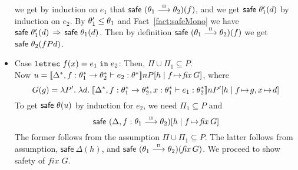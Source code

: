 \documentclass[submission,copyright,creativecommons]{eptcs}
\newcommand{\IN}{\mbox{\texttt{in}}}
\newcommand{\LET}{\mbox{\texttt{let}}}
\newcommand{\REC}{{\texttt{rec}}}
\newcommand{\ldb}{[\![}
\newcommand{\rdb}{]\!]}
\newcommand{\means}[1]{\ldb {#1}\rdb}
\newcommand{\union}{\cup}
\newcommand{\proves}{\vdash}
\newcommand{\ext}[3]{[#1\mid#2\!\mapsto\!#3]}
\newcommand{\recext}[5]{[#1\mid#2\!\mapsto\!#3,#4\!\mapsto\!#5]}
\newcommand{\lam}[2]{\lambda #1.\; #2} \newcommand{\all}[2]{\forall #1.\; #2}
\def\lpields#1{\stackrel{#1}{\longrightarrow}}
\newcommand{\annoto}[1]{\lpields {\scriptscriptstyle #1}}
\newcommand{\recdecl}[3]{\REC\;#1(#2) = #3}
\newcommand{\fix}{\textit{fix}}
\newcommand{\safe}{\textsf{safe}}
\newcommand{\letdecl}[2]{\LET#1\;\IN\;#2}
\newcommand{\n}{n} \newcommand{\p}{p} \newcommand{\Ps}{\Pi} \newcommand{\h}{h}
\renewcommand{\implies}{\mathbin{\:\Rightarrow\:}}
\newenvironment{xproof}{\begin{trivlist}\item[\hskip\labelsep{\bf  
Proof:}]}{\end{trivlist}}
\begin{document}
\begin{xproof}
\begin{itemize}
we get by induction on $e_1$ that $\safe~(\th_{1}\annoto{\Ps}\th_{2})(f)$, 
and we get $\safe~ {\th'_1}(d)$ by induction on $e_2$. 
By $\theta'_1\leq \theta_1$ and Fact~\ref{fact:safeMono} we have $\safe~
{\th'_1}(d)\implies \safe~ {\th_1}(d)$. 
Then by definition $\safe~(\th_{1}\annoto{\Ps}\th_{2})(f)$ we get
$\safe~ {\th_2}(f P d)$.
\item Case $\letdecl{\recdecl{f}{x}{e_1}}{e_2}$:
Then, $\Ps\union\Ps_1\subseteq P$.\\
Now $u=\means{\Delta^*,f:\th_1^*\to\th_2^*\proves e_2:\th^*}\n P 
\ext{\h}{f}{\fix\;G}$, where
\[ 
G(g)=\lam{P'}
         {\lam{d}
              {\means{\Delta^*,f:\th_1^*\to\th_2^*,x:\th_1^*
               \proves e_1:\th_2^*}\n P'\recext{\h}{f}{g}{x}{d}}}
\]
To get $\safe~ {\th}(u)$ by induction for $e_2$, we need 
$\Ps_1\subseteq P$ and 
\[
\safe~ {(\Delta,f:\th_1\annoto{\Ps}\th_2)}\ext{\h}{f}{\fix\;G} \] 
The former follows from the assumption $\Ps\union\Ps_1\subseteq P$.
The latter follows from assumption, $\safe~ {\Delta}(\h )$, and 
$\safe~(\th_1\annoto{\Ps}\th_2)(\fix\;G)$.
We proceed to show safety of $\fix\;G$.  


\end{itemize}
\end{xproof}
\end{document}
